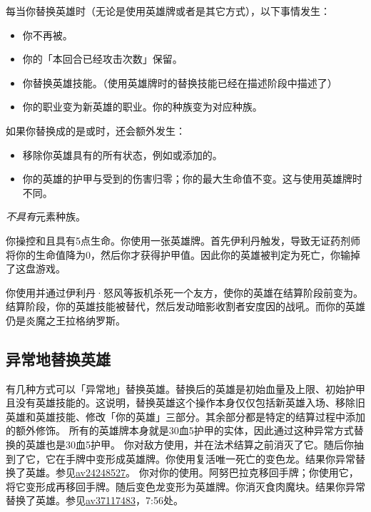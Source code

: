 每当你替换英雄时（无论是使用英雄牌或者是其它方式），以下事情发生：
\begin{itemize}
    \item 你不再被。
    \item 你的「本回合已经攻击次数」保留。
    \item 你替换英雄技能。（使用英雄牌时的替换技能已经在描述阶段中描述了）
    \item 你的职业变为新英雄的职业。你的种族变为对应种族。
\end{itemize}

如果你替换成的是或时，还会额外发生：

\begin{itemize}
    \item 移除你英雄具有的所有状态，例如或添加的。
    \item 你的英雄的护甲与受到的伤害归零；你的最大生命值不变。这与使用英雄牌时不同。
\end{itemize}

\notice {}\emph{不具有}元素种族。

\example 你操控和且具有5点生命。你使用一张英雄牌。首先伊利丹触发，导致无证药剂师将你的生命值降为0，然后你才获得护甲值。因此你的英雄被判定为死亡，你输掉了这盘游戏。

\example 你使用并通过伊利丹·怒风等扳机杀死一个友方，使你的英雄在结算阶段前变为。结算阶段，你的英雄技能被替代，然后发动暗影收割者安度因的战吼。而你的英雄仍是炎魔之王拉格纳罗斯。

\subsection{异常地替换英雄}
有几种方式可以「异常地」替换英雄。替换后的英雄是初始血量及上限、初始护甲且没有英雄技能的。这说明，替换英雄这个操作本身仅仅包括新英雄入场、移除旧英雄和英雄技能、修改「你的英雄」三部分。其余部分都是特定的结算过程中添加的额外修饰。
\notice 所有的英雄牌本身就是30血5护甲的实体，因此通过这种异常方式替换的英雄也是30血5护甲。
\example {} 你对敌方使用，并在法术结算之前消灭了它。随后你抽到了它，它在手牌中变形成英雄牌。你使用复活唯一死亡的变色龙。结果你异常替换了英雄。参见\href{https://www.bilibili.com/video/av24248527}{av24248527}。
\example 你对你的使用。阿努巴拉克移回手牌；你使用它，将它变形成再移回手牌。随后变色龙变形为英雄牌。你消灭食肉魔块。结果你异常替换了英雄。参见\href{https://www.bilibili.com/video/av37117483}{av37117483}，7:56处。

